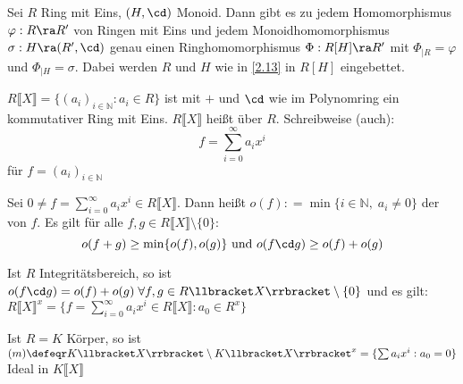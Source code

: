 \begin{Satz}
Sei $R$ Ring mit Eins, $(H,\cd)$ Monoid. Dann gibt es zu jedem
Homomorphismus $\varphi: R \ra R'$ von Ringen mit Eins und jedem
Monoidhomomorphismus $\sigma: H\ra (R',\cd)$ genau einen
Ringhomomorphismus $\Phi: R[H] \ra R'$ mit $\Phi_{|R} = \varphi$ und
$\Phi_{|H} = \sigma$. Dabei werden $R$ und $H$ wie in \ref{2.13} in
$R[H]$ eingebettet. \newline {}
\end{Satz}

\begin{DefBem}
\begin{enum}
\item $R\llbracket X\rrbracket = \{ (a_i)_{i \in \mathbb{N}}: a_i \in
R\}$ ist mit $+$ und $\cd$ wie im Polynomring ein kommutativer Ring
mit Eins. $R\llbracket X\rrbracket$ heißt  über $R$.
\newline Schreibweise (auch): \[f = \sum_{i=0}^\infty a_i x^i\] für
$f=(a_i)_{i \in \mathbb{N}}$
\item Sei $0 \neq f = \sum_{i=0}^\infty a_i x^i \in
R\llbracket X\rrbracket$. Dann heißt $o(f) \mathrel{\mathop:}=
\min\{i \in \mathbb{N},\; a_i \neq 0 \}$ der  von
$f$. Es gilt für alle $f,g \in R\llbracket X\rrbracket \setminus
\{0\}:$ \[o(f+g) \geq \min \{o(f), o(g)\} \mbox{ und } o(f\cd g)
\geq o(f) + o(g)\]

\item Ist $R$ Integritätsbereich, so ist $o(f\cd g) = o(f) + o(g)\;
\forall f,g \in R\llbracket X\rrbracket \setminus \{0\}$ und es
gilt: $R\llbracket X\rrbracket^x = \{ f = \sum_{i=0}^\infty a_i x^i
\in R\llbracket X\rrbracket : a_0 \in R^x \}$

\item Ist $R = K$ Körper, so ist $\mathcal(m) \defeqr K\llbracket
X\rrbracket \setminus K\llbracket X\rrbracket^x = \{ \sum a_i x^i :
a_0 = 0\}$ Ideal in $K\llbracket X\rrbracket$

\end{enum}
\end{DefBem}